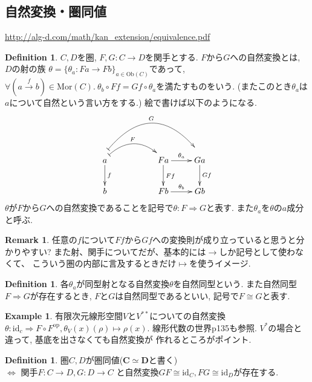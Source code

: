\documentclass[a4paper,10pt]{article}
\theoremstyle{definition}
\newtheorem{definition}[thm]{\bfseries Definition}
\newtheorem{remark}[thm]{\bfseries Remark}    %
\newtheorem{exmp}[thm]{\bfseries Example}
\begin{document}
\subsection{自然変換・圏同値}
\url{http://alg-d.com/math/kan_extension/equivalence.pdf}
\begin{definition}
    $C,D$を圏, $F,G:C \rightarrow D$を関手とする. $F$から$G$への自然変換とは, $D$の射の族
    $\theta=\{\theta_a: Fa \rightarrow Fb\}_{a\in \mathrm{Ob}(C)}$であって, 
    $\forall (a \xrightarrow{f} b) \in \mathrm{Mor}(C).\  \theta_b \circ Ff = Gf \circ \theta_a$を満たすものをいう. 
    (またこのとき$\theta_a$は$a$について自然という言い方をする.) 絵で書けば以下のようになる. 
    \begin{align*}
\xymatrix{
a\ar@{|->}@/^18pt/@<0.5ex>[rr]^-{F} \ar[d]^-{f} 
\ar@{|->}@/^36pt/@<2.0ex>[rrr]^-{G}& & 
Fa\ar[r]^-{\theta_a} \ar[d]^{Ff}& Ga \ar[d]^-{Gf} \\
b& 
& Fb\ar[r]^-{\theta_b}& Gb
}
    \end{align*}
$\theta$が$F$から$G$への自然変換であることを記号で$\theta: F \Rightarrow G$と表す.
また$\theta_a$を$\theta$の$a$成分と呼ぶ.
\end{definition}
\begin{remark}
    任意の$f$について$Ff$から$Gf$への変換則が成り立っていると思うと分かりやすい?
    また射、関手についてだが、基本的には$\rightarrow$しか記号として使わなくて、
    こういう圏の内部に言及するときだけ$\mapsto$を使うイメージ.
\end{remark}
\begin{definition}
    各$\theta_a$が同型射となる自然変換$\theta$を自然同型という. また自然同型
    $F \Rightarrow G$が存在するとき, $F$と$G$は自然同型であるといい,
    記号で$F \cong G$と表す.
\end{definition}
\begin{exmp}
    有限次元線形空間$V$と$V^{**}$についての自然変換$\theta: \mathrm{id}_c 
    \Rightarrow F \circ F^{\mathrm{op}}, \theta_V(x)(\rho) \mapsto \rho(x)$.
    線形代数の世界p135も参照. $V^*$の場合と違って, 基底を出さなくても自然変換が
    作れるところがポイント.
\end{exmp}
\begin{definition}
    圏$C, D$が圏同値($\bm{C \simeq D}$と書く)\\
    $\Longleftrightarrow$ 関手$F: C \rightarrow D, G: D \rightarrow C$
    と自然変換$GF \cong \mathrm{id}_C, FG \cong \mathrm{id}_D$が存在する. 
\end{definition}
\end{document}
